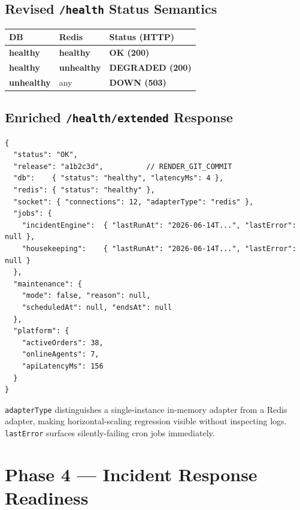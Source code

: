 \documentclass[12pt,a4paper]{article}
\newcommand{\cellok}[1]{\cellcolor{ok!15}\textbf{\color{ok}#1}}
\newcommand{\cellwarn}[1]{\cellcolor{warn!20}\textbf{\color{warn}#1}}
\newcommand{\cellcrit}[1]{\cellcolor{crit!15}\textbf{\color{crit}#1}}
\begin{document}
\subsection{Revised \texttt{/health} Status Semantics}

\begin{center}
\begin{tabular}{lll}
\toprule
\textbf{DB} & \textbf{Redis} & \textbf{Status (HTTP)} \\
\midrule
\cellok{healthy} & \cellok{healthy}   & \cellok{OK (200)} \\
\cellok{healthy} & \cellcrit{unhealthy} & \cellwarn{DEGRADED (200)} \\
\cellcrit{unhealthy} & any            & \cellcrit{DOWN (503)} \\
\bottomrule
\end{tabular}
\end{center}

\subsection{Enriched \texttt{/health/extended} Response}

\begin{lstlisting}[caption={New /health/extended payload (abridged)}]
{
  "status": "OK",
  "release": "a1b2c3d",          // RENDER_GIT_COMMIT
  "db":    { "status": "healthy", "latencyMs": 4 },
  "redis": { "status": "healthy" },
  "socket": { "connections": 12, "adapterType": "redis" },
  "jobs": {
    "incidentEngine":  { "lastRunAt": "2026-06-14T...", "lastError": null },
    "housekeeping":    { "lastRunAt": "2026-06-14T...", "lastError": null }
  },
  "maintenance": {
    "mode": false, "reason": null,
    "scheduledAt": null, "endsAt": null
  },
  "platform": {
    "activeOrders": 38,
    "onlineAgents": 7,
    "apiLatencyMs": 156
  }
}
\end{lstlisting}

\texttt{adapterType} distinguishes a single-instance in-memory adapter from a
Redis adapter, making horizontal-scaling regression visible without inspecting
logs.  \texttt{lastError} surfaces silently-failing cron jobs immediately.

\newpage

\section{Phase 4 — Incident Response Readiness}
\end{document}
